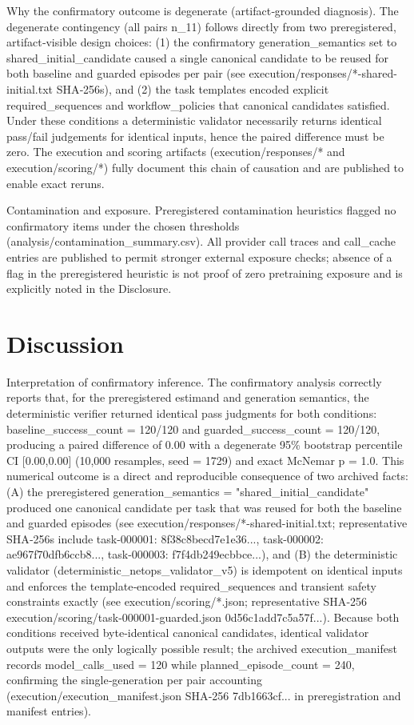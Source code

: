 \documentclass[conference]{IEEEtran}
\begin{document}
Why the confirmatory outcome is degenerate (artifact‑grounded diagnosis). The degenerate contingency (all pairs n\_11) follows directly from two preregistered, artifact‑visible design choices: (1) the confirmatory generation\_semantics set to shared\_initial\_candidate caused a single canonical candidate to be reused for both baseline and guarded episodes per pair (see execution/responses/*-shared-initial.txt SHA‑256s), and (2) the task templates encoded explicit required\_sequences and workflow\_policies that canonical candidates satisfied. Under these conditions a deterministic validator necessarily returns identical pass/fail judgements for identical inputs, hence the paired difference must be zero. The execution and scoring artifacts (execution/responses/* and execution/scoring/*) fully document this chain of causation and are published to enable exact reruns.

Contamination and exposure. Preregistered contamination heuristics flagged no confirmatory items under the chosen thresholds (analysis/contamination\_summary.csv). All provider call traces and call\_cache entries are published to permit stronger external exposure checks; absence of a flag in the preregistered heuristic is not proof of zero pretraining exposure and is explicitly noted in the Disclosure.

\section{Discussion}
Interpretation of confirmatory inference. The confirmatory analysis correctly reports that, for the preregistered estimand and generation semantics, the deterministic verifier returned identical pass judgments for both conditions: baseline\_success\_count = 120/120 and guarded\_success\_count = 120/120, producing a paired difference of 0.00 with a degenerate 95\% bootstrap percentile CI [0.00,0.00] (10,000 resamples, seed = 1729) and exact McNemar p = 1.0. This numerical outcome is a direct and reproducible consequence of two archived facts: (A) the preregistered generation\_semantics = "shared\_initial\_candidate" produced one canonical candidate per task that was reused for both the baseline and guarded episodes (see execution/responses/*-shared-initial.txt; representative SHA‑256s include task-000001: 8f38c8becd7e1e36..., task-000002: ae967f70dfb6ccb8..., task-000003: f7f4db249ecbbce...), and (B) the deterministic validator (deterministic\_netops\_validator\_v5) is idempotent on identical inputs and enforces the template‑encoded required\_sequences and transient safety constraints exactly (see execution/scoring/*.json; representative SHA‑256 execution/scoring/task-000001-guarded.json 0d56c1add7c5a57f...). Because both conditions received byte‑identical canonical candidates, identical validator outputs were the only logically possible result; the archived execution\_manifest records model\_calls\_used = 120 while planned\_episode\_count = 240, confirming the single‑generation per pair accounting (execution/execution\_manifest.json SHA‑256 7db1663cf... in preregistration and manifest entries).
\end{document}
